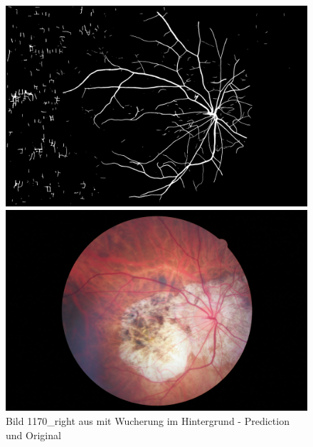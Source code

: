 \begin{figure}[H]
\begin{minipage}{.5\textwidth}
\includegraphics[width=\textwidth]{Pictures/nnUnet/Praxis/Task205-Augen-minimal-13-trainsamples/extra_Bilder/1170_right.png}
\end{minipage}%
\begin{minipage}{.5\textwidth}
\includegraphics[width=\textwidth]{Pictures/nnUnet/Praxis/Task205-Augen-minimal-13-trainsamples/extra_Bilder/1170_right-original.jpeg}
\end{minipage}
\caption{Bild 1170\_right aus \cite{retina2dExtra} mit Wucherung im Hintergrund - Prediction und Original}
\label{pic:retinaExtraB}
\end{figure}




